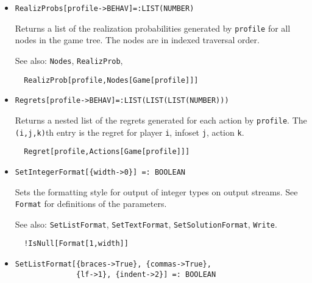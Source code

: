 \begin{itemize}
\item{}
\protect \large \begin{verbatim}
RealizProbs[profile->BEHAV]=:LIST(NUMBER)
\end{verbatim}\normalsize

\bd
Returns a list of the realization probabilities generated by
\verb+profile+ for all nodes in the game tree.  The nodes are in indexed
traversal order.
\item [See also:] \verb+Nodes+, \verb+RealizProb+, 

\begin{verbatim}
  RealizProb[profile,Nodes[Game[profile]]]
\end{verbatim}

\ed

\item{}
\protect \large \begin{verbatim}
Regrets[profile->BEHAV]=:LIST(LIST(LIST(NUMBER)))
\end{verbatim} \normalsize

\bd
Returns a nested list of the regrets generated for each action by
\verb+profile+.  The \verb+(i,j,k)+th entry is the regret for player
\verb+i+, infoset \verb+j+, action \verb+k+.
\ed

\begin{verbatim}
  Regret[profile,Actions[Game[profile]]]
\end{verbatim}


\item{}
\protect \large \begin{verbatim}
SetIntegerFormat[{width->0}] =: BOOLEAN 
\end{verbatim}\normalsize

\bd 
Sets the formatting style for output of integer types on output
streams.  See \verb+Format+ for definitions of the parameters.
\item [See also:] \verb+SetListFormat+, \verb+SetTextFormat+, 
\verb+SetSolutionFormat+, \verb+Write+.
\begin{verbatim}
  !IsNull[Format[1,width]]
\end{verbatim} 
\ed

\item{}
\protect \large \begin{verbatim}
SetListFormat[{braces->True}, {commas->True}, 
              {lf->1}, {indent->2}] =: BOOLEAN 
\end{verbatim} \normalsize


\end{itemize}
